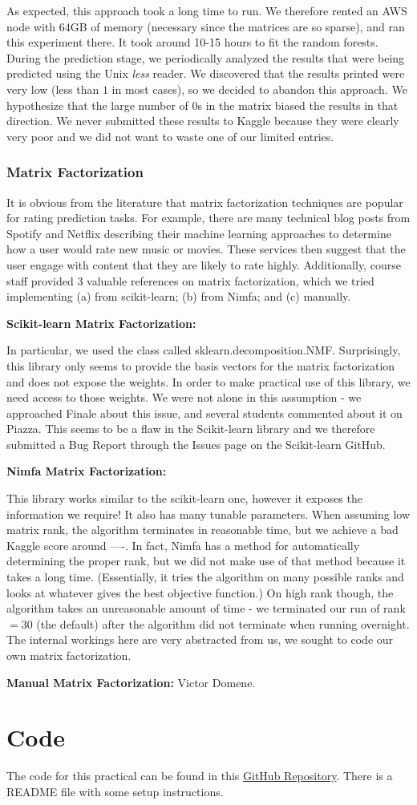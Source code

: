 \documentclass[10pt]{article}
\begin{document}
As expected, this approach took a long time to run. We therefore rented an AWS node with 64GB of memory (necessary since the matrices are so sparse), and ran this experiment there. It took around 10-15 hours to fit the random forests. During the prediction stage, we periodically analyzed the results that were being predicted using the Unix {\it less} reader. We discovered that the results printed were very low (less than $1$ in most cases), so we decided to abandon this approach. We hypothesize that the large number of $0$s in the matrix biased the results in that direction. We never submitted these results to Kaggle because they were clearly very poor and we did not want to waste one of our limited entries.

\subsubsection{Matrix Factorization}
It is obvious from the literature that matrix factorization techniques are popular for rating prediction tasks. For example, there are many technical blog posts from Spotify and Netflix describing their machine learning approaches to determine how a user would rate new music or movies. These services then suggest that the user engage with content that they are likely to rate highly. Additionally, course staff provided $3$ valuable references on matrix factorization, which we tried implementing (a) from scikit-learn; (b) from Nimfa; and (c) manually.

{\bf Scikit-learn Matrix Factorization:}

In particular, we used the class called sklearn.decomposition.NMF. Surprisingly, this library only seems to provide the basis vectors for the matrix factorization and does not expose the weights. In order to make practical use of this library, we need access to those weights. We were not alone in this assumption - we approached Finale about this issue, and several students commented about it on Piazza. This seems to be a flaw in the Scikit-learn library and we therefore submitted a Bug Report through the Issues page on the Scikit-learn GitHub.

{\bf Nimfa Matrix Factorization:}

This library works similar to the scikit-learn one, however it exposes the information we require! It also has many tunable parameters. When assuming low matrix rank, the algorithm terminates in reasonable time, but we achieve a bad Kaggle score around ----.  In fact, Nimfa has a method for automatically determining the proper rank, but we did not make use of that method because it takes a long time. (Essentially, it tries the algorithm on many possible ranks and looks at whatever gives the best objective function.) On high rank though, the algorithm takes an unreasonable amount of time - we terminated our run of rank$=30$ (the default) after the algorithm did not terminate when running overnight. The internal workings here are very abstracted from us, we sought to code our own matrix factorization.

{\bf Manual Matrix Factorization:}
Victor Domene.

\section{Code}

The code for this practical can be found in this \href{https://github.com/victordomene/cs181-practicals/tree/master/practical3}{GitHub Repository}. There is a README file with some setup instructions.
\end{document}
